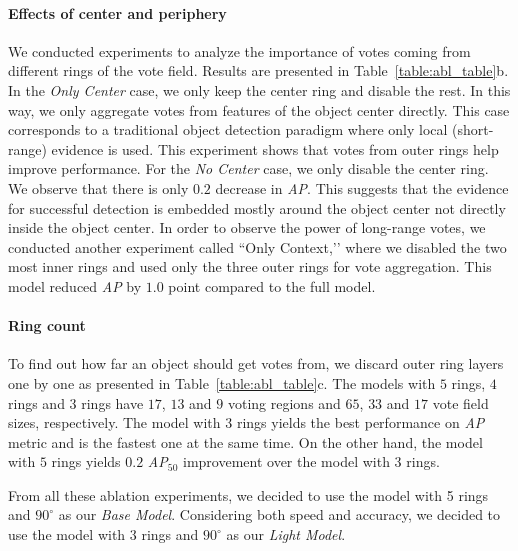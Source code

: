 \documentclass[runningheads]{llncs}
\begin{document}
                          
\paragraph{\textbf{Effects of center and periphery}} We conducted experiments to analyze the importance of votes coming from different rings of the vote field. Results are presented in Table~\ref{table:abl_table}b. In the \textit{Only Center} case, we only keep the center ring and disable the rest. In this way, we only aggregate votes from features of the object center directly. This case corresponds to a traditional object detection paradigm where only local (short-range) evidence is used.  This experiment shows that votes from outer rings help  improve performance. For the \textit{No Center} case,  we only disable the  center ring. We observe that there is only $0.2 $ decrease in \textit{AP}. This suggests that the evidence  for successful detection is embedded mostly around the object center not directly inside the object center. In order to observe the power of long-range votes, we conducted another experiment called ``Only Context,’’ where we disabled the two most inner rings and used  only the three outer rings for vote aggregation. This model  reduced \textit{AP} by $1.0$ point compared to the full model. 




        
\paragraph{\textbf{Ring count}} To find out how far an object should get votes from, we discard outer ring layers one by one as presented in Table~\ref{table:abl_table}c. The models with $5$ rings, $4$ rings and $3$ rings have $17$, $13$ and $9$ voting regions and $65$, $33$ and $17$ vote field sizes, respectively. The model with $3$ rings yields the best performance on \textit{AP} metric and is the fastest one at the same time. On the other hand, the model with $5$ rings yields $0.2$ \textit{AP$_{50}$} improvement over the model with $3$ rings. 


From all these ablation experiments, we decided to use the model with 5 rings and $90^\circ$ as our \textit{Base Model}. Considering both speed and accuracy, we decided to use the model with $3$ rings and $90^\circ$ as our \textit{Light Model}. 
\end{document}
